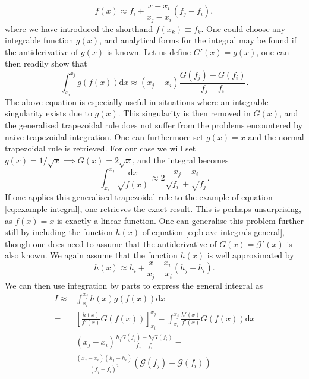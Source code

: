 \begin{equation}
    f(x) \approx f_i + \frac{x - x_i}{x_j - x_i} \left( f_j - f_i \right),
\end{equation}
where we have introduced the shorthand $f(x_k) \equiv f_k$. One could choose any integrable function $g(x)$, and analytical forms for the integral may be found if the antiderivative of $g(x)$ is known. Let us define $G'(x) = g(x)$, one can then readily show that
\begin{equation}
    \int_{x_i}^{x_j} g(f(x)) \mathrm{d}x \approx (x_j - x_i)\frac{G(f_j) - G(f_i)}{f_j - f_i}.
    \label{eq:gtrapz}
\end{equation}
The above equation is especially useful in situations where an integrable singularity exists due to $g(x)$. This singularity is then removed in $G(x)$, and the generalised trapezoidal rule does not suffer from the problems encountered by naive trapezoidal integration. One can furthermore set $g(x)=x$ and the normal trapezoidal rule is retrieved. For our case we will set $g(x) = 1/\sqrt{x} \implies G(x) = 2\sqrt{x}$, and the integral becomes
\begin{equation}
    \int_{x_i}^{x_j} \frac{\mathrm{d} x}{\sqrt{f(x)}} \approx 2 \frac{x_j - x_i}{\sqrt{f_i} + \sqrt{f_j}}.
\end{equation}
If one applies this generalised trapezoidal rule to the example of equation \eqref{eq:example-integral}, one retrieves the exact result. This is perhaps unsurprising, as $f(x) = x$ is exactly a linear function. One can generalise this problem further still by including the function $h(x)$ of  equation \eqref{eq:b-ave-integrals-general}, though one does need to assume that the antiderivative of $G(x)=\mathcal{G}'(x)$ is also known. We again assume that the function $h(x)$ is well approximated by
\begin{equation}
     h(x) \approx h_i + \frac{x - x_i}{x_j - x_i} \left( h_j - h_i \right).
\end{equation}
We can then use integration by parts to express the general integral as
\begin{equation}
\begin{aligned}
    I \approx & \int_{x_i}^{x_j} h(x) g(f(x))\mathrm{d} x  \\
    =& \left[ \frac{h(x)}{f'(x)} G(f(x))  \right]_{x_i}^{x_j} - \int_{x_i}^{x_j} \frac{h'(x)}{f'(x)} G(f(x)) \mathrm{d}x  \\
    =& (x_j - x_i) \frac{h_jG(f_j) - h_iG(f_i)}{f_j - f_i} - \\
    &  \frac{(x_j - x_i) (h_j - h_i)}{(f_j - f_i)^2} \left( \mathcal{G}(f_j) - \mathcal{G}(f_i) \right)
\end{aligned}
\label{eq:trapz-general}
\end{equation}
